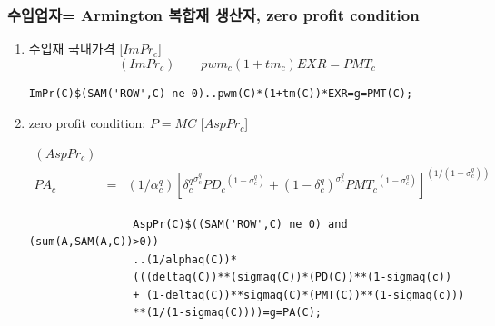 \documentclass[10pt,compress,slidetop,%
			   hyperref={unicode},xcolor={svgnames},%
			   t]{beamer}
\begin{document}
\begin{frame}[fragile]
	\frametitle{수입업자= Armington 복합재 생산자, zero profit condition}
\begin{scriptsize}
\begin{enumerate}
		\item{수입재 국내가격 [$ImPr_c$]}
\begin{displaymath}
(ImPr_c)\qquad pwm_c(1+tm_c)EXR=PMT_c
\end{displaymath}

\begin{verbatim}
ImPr(C)$(SAM('ROW',C) ne 0)..pwm(C)*(1+tm(C))*EXR=g=PMT(C);   
\end{verbatim}
		\item{zero profit condition: $P=MC$ [$AspPr_c$]}

\begin{eqnarray*}
(AspPr_c)& &\\
PA_c&=&(1/\alpha^q_c)[{\delta^q_c}^{\sigma^q_c}{PD_c}^{(1-\sigma^q_c)}+{(1-\delta^q_c)}^{\sigma^q_c}{PMT_c}^{(1-\sigma^q_c)}]^{(1/(1-\sigma^q_c))}
\end{eqnarray*}
\begin{verbatim}
				AspPr(C)$((SAM('ROW',C) ne 0) and (sum(A,SAM(A,C))>0))
				..(1/alphaq(C))*
				(((deltaq(C))**(sigmaq(C))*(PD(C))**(1-sigmaq(c))
				+ (1-deltaq(C))**sigmaq(C)*(PMT(C))**(1-sigmaq(c)))
				**(1/(1-sigmaq(C))))=g=PA(C);
\end{verbatim}
\end{enumerate}
\end{scriptsize}
\end{frame}
\end{document}
